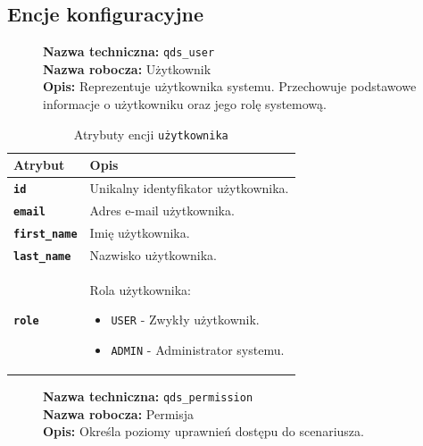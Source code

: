 \subsection{Encje konfiguracyjne}

\begin{figure}[H]
    \centering
    \begin{minipage}{0.8\textwidth}
        \begin{framed}
            \noindent\textbf{\large Nazwa techniczna:} \texttt{qds\_user} \\
            \textbf{\large Nazwa robocza:} Użytkownik \\
            \textbf{\large Opis:} Reprezentuje użytkownika systemu. Przechowuje podstawowe informacje o użytkowniku
            oraz jego rolę systemową.
        \end{framed}
    \end{minipage}
\end{figure}

\begin{table}[H]
    \centering
    \renewcommand{\arraystretch}{1.6}
    \begin{tabular}{|>{\bfseries}l|p{}|}
        \hline
        \rowcolor[HTML]{EFEFEF} \textbf{Atrybut} & \textbf{Opis} \\
        \hline
        \texttt{id} & Unikalny identyfikator użytkownika. \\
        \hline
        \texttt{email} & Adres e-mail użytkownika. \\
        \hline
        \texttt{first\_name} & Imię użytkownika. \\
        \hline
        \texttt{last\_name} & Nazwisko użytkownika. \\
        \hline
        \texttt{role} & Rola użytkownika:
        \begin{itemize}
            \item \texttt{USER} - Zwykły użytkownik.
            \item \texttt{ADMIN} - Administrator systemu.
        \end{itemize} \\
        \hline
    \end{tabular}
    \caption{Atrybuty encji \texttt{użytkownika}}
\end{table}

\begin{figure}[H]
    \centering
    \begin{minipage}{0.8\textwidth}
        \begin{framed}
            \noindent\textbf{\large Nazwa techniczna:} \texttt{qds\_permission} \\
            \textbf{\large Nazwa robocza:} Permisja \\
            \textbf{\large Opis:} Określa poziomy uprawnień dostępu do scenariusza.
        \end{framed}
    \end{minipage}
\end{figure}

